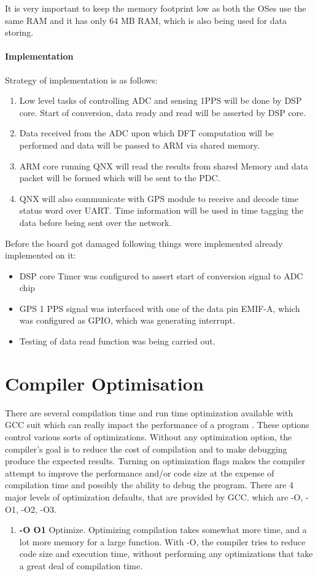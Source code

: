 \begin{appendix}
\begin{itemize}
\end{itemize}
It is very important to keep the memory footprint low as both the OSes use the same RAM and it has only 64 MB RAM, which is also being used for data storing.

\subsubsection{Implementation}
Strategy of implementation is as follows:
\begin{enumerate}
	\item Low level tasks of controlling ADC and sensing 1PPS will be done by DSP core.  Start of conversion, data ready and read will be asserted by DSP core. 
	\item Data received from the ADC upon which DFT computation will be performed and data will be passed to ARM via shared memory.
	\item ARM core running QNX will read the results from shared Memory and data packet will be formed which will be sent to the PDC.
	\item QNX will also communicate with GPS module to receive and decode time status word over UART. Time information will be used in time tagging the data before being sent over the network. 
\end{enumerate}
Before the board got damaged following things were implemented already implemented on it:
\begin{itemize}
	\item DSP core Timer was configured to assert start of conversion signal to ADC chip
	\item GPS 1 PPS signal was interfaced with one of the data pin EMIF-A, which was configured as GPIO, which was generating interrupt. 
	\item Testing of data read function was being carried out.
\end{itemize}

\chapter{Compiler Optimisation}

There are several compilation time and run time optimization available with GCC suit which can really impact the performance of a program \cite{compilerOpti}. These options control various sorts of optimizations. Without any optimization option, the compiler's goal is to reduce the cost of compilation and to make debugging produce the expected results. Turning on optimization flags makes the compiler attempt to improve the performance and/or code size at the expense of compilation time and possibly the ability to debug the program. There are 4 major levels of optimization defaults, that are provided by GCC. which are -O, -O1, -O2, -O3.
\begin{enumerate}
	\item \textbf{-O O1}
	Optimize. Optimizing compilation takes somewhat more time, and a lot more memory for a large function. With -O, the compiler tries to reduce code size and execution time, without performing any optimizations that take a great deal of compilation time.
	

\end{enumerate}
\end{appendix}
